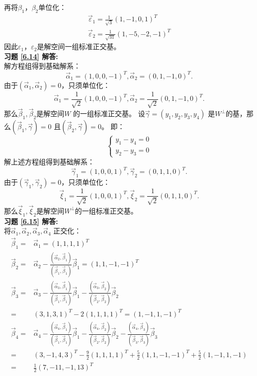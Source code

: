再将$\beta_1$，$\beta_2$单位化：
\begin{align*}
\vec{\varepsilon}_1=\frac{1}{\sqrt{3}}(1,-1,0,1)^T\\
\vec{\varepsilon}_2=\frac{1}{\sqrt{31}}(1,-5,-2,-1)^T
\end{align*}
因此$\varepsilon_1$，$\varepsilon_2$是解空间一组标准正交基。\\
\textbf{习题 \ref{6.14} 解答:}\\
解方程组得到基础解系：
\begin{equation*}
\vec{\alpha}_1=(1,0,0,-1)^T,\vec{\alpha}_2=(0,1,-1,0)^T.
\end{equation*}
由于$(\vec{\alpha}_1,\vec{\alpha}_2)=0$，只须单位化：
\begin{equation*}
\vec{\alpha}_1=\frac{1}{\sqrt{2}}(1,0,0,-1)^T,
\vec{\alpha}_2=\frac{1}{\sqrt{2}}(0,1,-1,0)^T.
\end{equation*}
那么$\vec{\beta}_1,\vec{\beta}_2$是解空间$W$ 的一组标准正交基。
设$\vec{\gamma}=(y_1,y_2,y_3,y_4)$ 是$W^{\bot}$的基，那么$(\vec{\beta}_1,\vec{\gamma})=0$ 且$(\vec{\beta}_2,\vec{\gamma})=0$。
即：
\begin{equation*}
\begin{cases}
  y_1-y_4=0\\
  y_2-y_3=0
\end{cases}
\end{equation*}
解上述方程组得到基础解系：
\begin{equation*}
\vec{\gamma}_1=(1,0,0,1)^T,\vec{\gamma}_2=(0,1,1,0)^T.
\end{equation*}
由于$(\vec{\gamma}_1,\vec{\gamma}_2)=0$，只须单位化：
\begin{equation*}
\vec{\xi}_1=\frac{1}{\sqrt{2}}(1,0,0,1)^T,
\vec{\xi}_2=\frac{1}{\sqrt{2}}(0,1,1,0)^T.
\end{equation*}
那么$\vec{\xi}_1,\vec{\xi}_2$是解空间$W^{\bot}$的一组标准正交基。\\
\textbf{习题 \ref{6.15} 解答:}\\
将$\vec{\alpha}_1,\vec{\alpha}_2,\vec{\alpha}_3,\vec{\alpha}_4$ 正交化：
\begin{align*}
\vec{\beta}_1=&\vec{\alpha}_1=(1,1,1,1)^T\\
\vec{\beta}_2=&\vec{\alpha}_2-\frac{(\vec{\alpha}_2,\vec{\beta}_1)}{(\vec{\beta}_1,\vec{\beta}_1)}\vec{\beta}_1=(1,1,-1,-1)^T\\
\vec{\beta}_3=&\vec{\alpha}_3-\frac{(\vec{\alpha}_3,\vec{\beta}_1)}{(\vec{\beta}_1,\vec{\beta}_1)}\vec{\beta}_1-
              \frac{(\vec{\alpha}_3,\vec{\beta}_2)}{(\vec{\beta}_2,\vec{\beta}_2)}\vec{\beta}_2\\
             =&(3,1,3,1)^T-2(1,1,1,1)^T=(1,-1,1,-1)^T\\
\vec{\beta}_4=&\vec{\alpha}_4-\frac{(\vec{\alpha}_4,\vec{\beta}_1)}{(\vec{\beta}_1,\vec{\beta}_1)}\vec{\beta}_1-
               \frac{(\vec{\alpha}_4,\vec{\beta}_2)}{(\vec{\beta}_2,\vec{\beta}_2)}\vec{\beta}_2
                -\frac{(\vec{\alpha}_4,\vec{\beta}_3)}{(\vec{\beta}_3,\vec{\beta}_3)}\vec{\beta}_3\\
             =&(3,-1,4,3)^T-\frac{9}{2}(1,1,1,1)^T+\frac{5}{2}(1,1,-1,-1)^T+\frac{5}{2}(1,-1,1,-1)\\
             =&\frac{1}{2}(7,-11,-1,13)^T
\end{align*}
